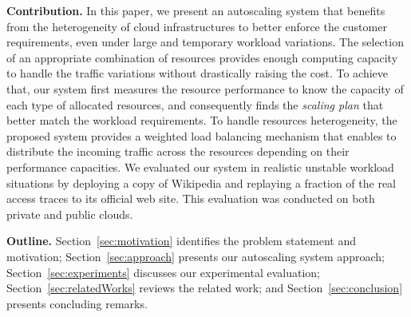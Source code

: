 




\textbf{Contribution.}  In this paper, we present an autoscaling system that benefits from the heterogeneity of cloud infrastructures to better enforce the customer requirements, even under large and temporary workload variations. The selection of an appropriate combination of resources provides enough computing capacity to handle the traffic variations without drastically raising the cost. To achieve that, our system first measures the resource performance to know the capacity of each type of allocated resources, and consequently finds the \emph{scaling plan} that better match the workload requirements. To handle resources heterogeneity, the proposed system provides a weighted load balancing mechanism that enables to distribute the incoming traffic across the resources depending on their performance capacities.
We evaluated our system in realistic unstable workload situations by deploying a copy of Wikipedia and replaying a fraction of the real access traces to its official web site. This evaluation was conducted on both private and public clouds.






\textbf{Outline.} Section~\ref{sec:motivation} identifies the problem statement and motivation; Section~\ref{sec:approach} presents our autoscaling system approach; Section~\ref{sec:experiments} discusses our experimental evaluation; Section~\ref{sec:relatedWorks} reviews the related work; and Section~\ref{sec:conclusion} presents concluding remarks.